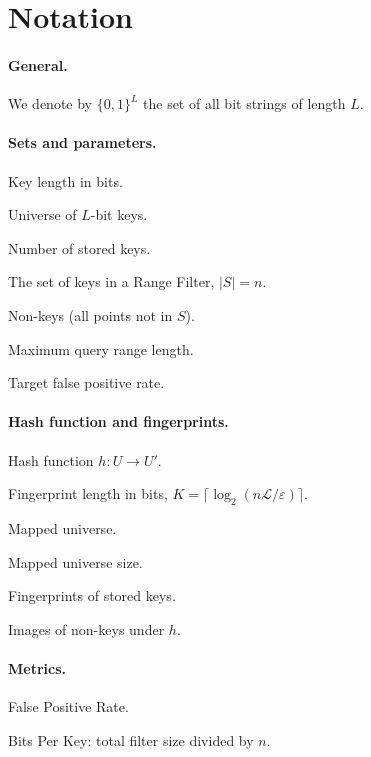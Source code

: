 \section{Notation}
\label{sec:notation}

\paragraph{General.}
We denote by $\{0,1\}^L$ the set of all bit strings of length $L$.

\paragraph{Sets and parameters.}
\begin{description}[style=nextline, leftmargin=4cm, labelwidth=3.4cm]
  \item[$L$] Key length in bits.
  \item[{$U = [0, 2^L]$}] Universe of $L$-bit keys.
  \item[$n$] Number of stored keys.
  \item[$S \subseteq U$] The set of keys in a Range Filter, $|S| = n$.
  \item[$Y = U \setminus S$] Non-keys (all points not in $S$).
  \item[$\mathcal{L}$] Maximum query range length.
  \item[$\varepsilon$] Target false positive rate.
\end{description}

\paragraph{Hash function and fingerprints.}
\begin{description}[style=nextline, leftmargin=4cm, labelwidth=3.4cm]
  \item[$h$] Hash function $h\colon U \to U'$.
  \item[$K$] Fingerprint length in bits, $K = \lceil\log_2(n\mathcal{L}/\varepsilon)\rceil$.
  \item[{$U' = [0, 2^K]$}] Mapped universe.
  \item[{$r = 2^K$}] Mapped universe size.
  \item[$S' = h(S)$] Fingerprints of stored keys.
  \item[$Y' = h(Y)$] Images of non-keys under $h$.
\end{description}

\paragraph{Metrics.}
\begin{description}[style=nextline, leftmargin=4cm, labelwidth=3.4cm]
  \item[FPR] False Positive Rate.
  \item[BPK] Bits Per Key: total filter size divided by $n$.
\end{description}

